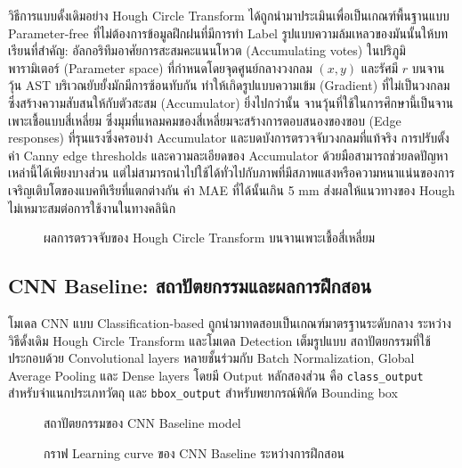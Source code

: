 วิธีการแบบดั้งเดิมอย่าง Hough Circle Transform ได้ถูกนำมาประเมินเพื่อเป็นเกณฑ์พื้นฐานแบบ Parameter-free ที่ไม่ต้องการข้อมูลฝึกฝนที่มีการทำ Label
รูปแบบความล้มเหลวของมันนั้นให้บทเรียนที่สำคัญ: อัลกอริทึมอาศัยการสะสมคะแนนโหวต (Accumulating votes) ในปริภูมิพารามิเตอร์ (Parameter space) ที่กำหนดโดยจุดศูนย์กลางวงกลม $(x, y)$ และรัศมี $r$
บนจานวุ้น AST บริเวณยับยั้งมักมีการซ้อนทับกัน ทำให้เกิดรูปแบบความเข้ม (Gradient) ที่ไม่เป็นวงกลม ซึ่งสร้างความสับสนให้กับตัวสะสม (Accumulator)
ยิ่งไปกว่านั้น จานวุ้นที่ใช้ในการศึกษานี้เป็นจานเพาะเชื้อแบบสี่เหลี่ยม ซึ่งมุมที่แหลมคมของสี่เหลี่ยมจะสร้างการตอบสนองของขอบ (Edge responses) ที่รุนแรงซึ่งครอบงำ Accumulator และบดบังการตรวจจับวงกลมที่แท้จริง
การปรับตั้งค่า Canny edge thresholds และความละเอียดของ Accumulator ด้วยมือสามารถช่วยลดปัญหาเหล่านี้ได้เพียงบางส่วน แต่ไม่สามารถนำไปใช้ได้ทั่วไปกับภาพที่มีสภาพแสงหรือความหนาแน่นของการเจริญเติบโตของแบคทีเรียที่แตกต่างกัน
ค่า MAE ที่ได้นั้นเกิน 5 mm ส่งผลให้แนวทางของ Hough ไม่เหมาะสมต่อการใช้งานในทางคลินิก

\begin{figure}[H]
  \centering
  \caption{ผลการตรวจจับของ Hough Circle Transform บนจานเพาะเชื้อสี่เหลี่ยม}
  \label{fig:hough_square}
\end{figure}

\subsection{CNN Baseline: สถาปัตยกรรมและผลการฝึกสอน}

โมเดล CNN แบบ Classification-based ถูกนำมาทดสอบเป็นเกณฑ์มาตรฐานระดับกลาง ระหว่างวิธีดั้งเดิม Hough Circle Transform และโมเดล Detection เต็มรูปแบบ สถาปัตยกรรมที่ใช้ประกอบด้วย Convolutional layers หลายชั้นร่วมกับ Batch Normalization, Global Average Pooling และ Dense layers โดยมี Output หลักสองส่วน คือ \texttt{class\_output} สำหรับจำแนกประเภทวัตถุ และ \texttt{bbox\_output} สำหรับพยากรณ์พิกัด Bounding box

\begin{figure}[H]
  \centering
  \caption{สถาปัตยกรรมของ CNN Baseline model}
  \label{fig:cnn_architecture}
\end{figure}

\begin{figure}[H]
  \centering
  \caption{กราฟ Learning curve ของ CNN Baseline ระหว่างการฝึกสอน}
  \label{fig:cnn_training}
\end{figure}

